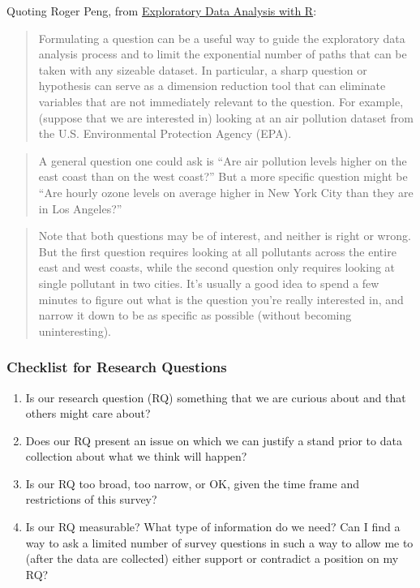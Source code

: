 \documentclass[]{book}
\providecommand{\tightlist}{%
  \setlength{\itemsep}{0pt}\setlength{\parskip}{0pt}}
\theoremstyle{definition}
\theoremstyle{definition}
\theoremstyle{definition}
\theoremstyle{remark}
\begin{document}
Quoting Roger Peng, from
\href{https://bookdown.org/rdpeng/exdata/}{Exploratory Data Analysis
with R}:

\begin{quote}
Formulating a question can be a useful way to guide the exploratory data
analysis process and to limit the exponential number of paths that can
be taken with any sizeable dataset. In particular, a sharp question or
hypothesis can serve as a dimension reduction tool that can eliminate
variables that are not immediately relevant to the question. For
example, (suppose that we are interested in) looking at an air pollution
dataset from the U.S. Environmental Protection Agency (EPA).
\end{quote}

\begin{quote}
A general question one could ask is ``Are air pollution levels higher on
the east coast than on the west coast?'' But a more specific question
might be ``Are hourly ozone levels on average higher in New York City
than they are in Los Angeles?''
\end{quote}

\begin{quote}
Note that both questions may be of interest, and neither is right or
wrong. But the first question requires looking at all pollutants across
the entire east and west coasts, while the second question only requires
looking at single pollutant in two cities. It's usually a good idea to
spend a few minutes to figure out what is the question you're really
interested in, and narrow it down to be as specific as possible (without
becoming uninteresting).
\end{quote}

\hypertarget{checklist-for-research-questions}{%
\subsubsection{Checklist for Research
Questions}\label{checklist-for-research-questions}}

\begin{enumerate}
\def\labelenumi{\arabic{enumi}.}
\tightlist
\item
  Is our research question (RQ) something that we are curious about and
  that others might care about?
\item
  Does our RQ present an issue on which we can justify a stand prior to
  data collection about what we think will happen?
\item
  Is our RQ too broad, too narrow, or OK, given the time frame and
  restrictions of this survey?
\item
  Is our RQ measurable? What type of information do we need? Can I find
  a way to ask a limited number of survey questions in such a way to
  allow me to (after the data are collected) either support or
  contradict a position on my RQ?
\end{enumerate}
\end{document}
